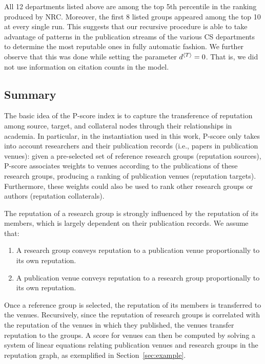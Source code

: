 \documentclass[notitlepage]{svjour3}
\begin{document}
All 12 departments listed above are among the top 5th percentile in the ranking produced by NRC. 
Moreover, the first 8 listed groups appeared among the top 10 at every single run.
This suggests that our recursive procedure is able to take advantage of patterns in the publication 
streams of the various CS departments to determine the most reputable ones in fully automatic fashion.
We further observe that this was done while setting the parameter $d{^{\langle T \rangle}} = 0$. That is, we did 
not use information on citation counts in the model. 

\subsection{Summary} 

The basic idea of the P-score index is to capture the transference of reputation among source, 
target, and collateral nodes through their relationships in academia. In particular, in the 
instantiation used in this work, P-score only takes into account researchers and 
their publication records (i.e., papers in publication venues): given a pre-selected 
set of reference research groups (reputation sources), 
P-score associates weights to venues according to the publications of these research groups, 
producing a ranking of publication venues (reputation targets). Furthermore, these weights could 
also be used to rank other research groups or authors (reputation collaterals).

The reputation of a research group is strongly influenced by the reputation of its members, 
which is largely dependent on their publication records. We assume that:
\begin{enumerate}
\item A research group conveys reputation to a publication venue proportionally to its own reputation.
\item A publication venue conveys reputation to a research group proportionally to its own reputation.
\end{enumerate}

Once a reference group is selected, the reputation of its members is transferred to the venues. 
Recursively, since the reputation of research groups is correlated with the reputation of the 
venues in which they published, the venues transfer reputation to the groups. A score for venues 
can then be computed by solving a system of linear equations relating publication venues and 
research groups in the reputation graph, as exemplified in Section~\ref{sec:example}.
\end{document}
